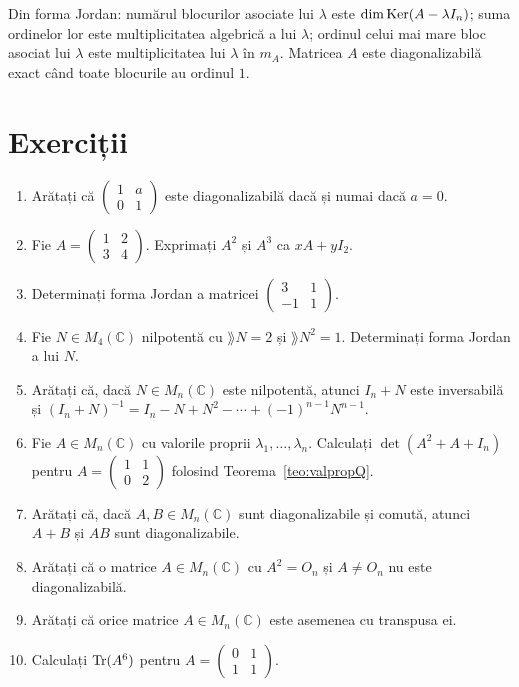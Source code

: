\begin{observatie}
Din forma Jordan: numărul blocurilor asociate lui $\lambda$ este $\dim\operatorname{Ker}(A-\lambda I_n)$; suma ordinelor lor este multiplicitatea algebrică a lui $\lambda$; ordinul celui mai mare bloc asociat lui $\lambda$ este multiplicitatea lui $\lambda$ în $m_A$. Matricea $A$ este diagonalizabilă exact când toate blocurile au ordinul $1$.
\end{observatie}

\section{Exerciții}

\begin{enumerate}[label=\textbf{\arabic*.},leftmargin=*]
\item Arătați că $\begin{pmatrix}1&a\\0&1\end{pmatrix}$ este diagonalizabilă dacă și numai dacă $a=0$.
\item Fie $A=\begin{pmatrix}1&2\\3&4\end{pmatrix}$. Exprimați $A^2$ și $A^3$ ca $xA+yI_2$.
\item Determinați forma Jordan a matricei $\begin{pmatrix}3&1\\-1&1\end{pmatrix}$.
\item Fie $N\in M_4(\mathbb{C})$ nilpotentă cu $\rang N=2$ și $\rang N^2=1$. Determinați forma Jordan a lui $N$.
\item Arătați că, dacă $N\in M_n(\mathbb{C})$ este nilpotentă, atunci $I_n+N$ este inversabilă și $(I_n+N)^{-1}=I_n-N+N^2-\cdots+(-1)^{n-1}N^{n-1}$.
\item Fie $A\in M_n(\mathbb{C})$ cu valorile proprii $\lambda_1,\dots,\lambda_n$. Calculați $\det(A^2+A+I_n)$ pentru $A=\begin{pmatrix}1&1\\0&2\end{pmatrix}$ folosind Teorema~\ref{teo:valpropQ}.
\item Arătați că, dacă $A,B\in M_n(\mathbb{C})$ sunt diagonalizabile și comută, atunci $A+B$ și $AB$ sunt diagonalizabile.
\item Arătați că o matrice $A\in M_n(\mathbb{C})$ cu $A^2=O_n$ și $A\neq O_n$ nu este diagonalizabilă.
\item Arătați că orice matrice $A\in M_n(\mathbb{C})$ este asemenea cu transpusa ei.
\item Calculați $\operatorname{Tr}(A^6)$ pentru $A=\begin{pmatrix}0&1\\1&1\end{pmatrix}$.
\end{enumerate}

